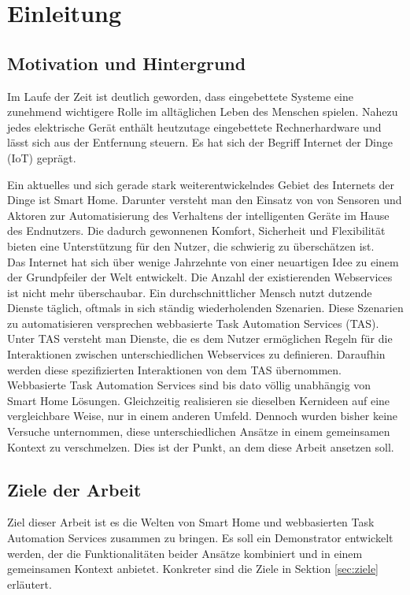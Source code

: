 \chapter{Einleitung}
\section{Motivation und Hintergrund}
Im Laufe der Zeit ist deutlich geworden, dass eingebettete Systeme eine zunehmend wichtigere Rolle im alltäglichen Leben des Menschen spielen. Nahezu jedes elektrische Gerät enthält heutzutage eingebettete Rechnerhardware und lässt sich aus der Entfernung steuern. Es hat sich der Begriff Internet der Dinge (IoT) geprägt.

Ein aktuelles und sich gerade stark weiterentwickelndes Gebiet des Internets der Dinge ist Smart Home. Darunter versteht man den Einsatz von von Sensoren und Aktoren zur Automatisierung des Verhaltens der intelligenten Geräte im Hause des Endnutzers. Die dadurch gewonnenen Komfort, Sicherheit und Flexibilität bieten eine Unterstützung für den Nutzer, die schwierig zu überschätzen ist. \\

Das Internet hat sich über wenige Jahrzehnte von einer neuartigen Idee zu einem der Grundpfeiler der Welt entwickelt. Die Anzahl der existierenden Webservices ist nicht mehr überschaubar. Ein durchschnittlicher Mensch nutzt dutzende Dienste täglich, oftmals in sich ständig wiederholenden Szenarien. Diese Szenarien zu automatisieren versprechen webbasierte Task Automation Services (TAS). Unter TAS versteht man Dienste, die es dem Nutzer ermöglichen Regeln für die Interaktionen zwischen unterschiedlichen Webservices zu definieren. Daraufhin werden diese spezifizierten Interaktionen von dem TAS übernommen.\\

Webbasierte Task Automation Services sind bis dato völlig unabhängig von Smart Home Lösungen. Gleichzeitig realisieren sie dieselben Kernideen auf eine vergleichbare Weise, nur in einem anderen Umfeld. Dennoch wurden bisher keine Versuche unternommen, diese unterschiedlichen Ansätze in einem gemeinsamen Kontext zu verschmelzen. Dies ist der Punkt, an dem diese Arbeit ansetzen soll.


\section{Ziele der Arbeit}
Ziel dieser Arbeit ist es die Welten von Smart Home und webbasierten Task Automation Services zusammen zu bringen. Es soll ein Demonstrator entwickelt werden, der die  Funktionalitäten beider Ansätze kombiniert und in einem gemeinsamen Kontext anbietet. Konkreter sind die Ziele in Sektion \ref{sec:ziele} erläutert.


